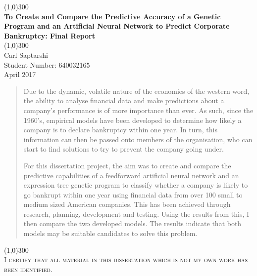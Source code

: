 \documentclass[11pt]{article}
\begin{document}
	\begin{titlepage}
		\begin{center}
			\line(1,0){300}\\
			[0.25in]
			\huge{\bfseries To Create and Compare the Predictive Accuracy of a Genetic Program and an Artificial Neural Network to Predict Corporate Bankruptcy: Final Report}\\
			\line(1,0){300}\\
			[0.25in]
			 Carl Saptarshi\\
			 \large  Student Number: 640032165 \\
			 April 2017 \\
			 \null\vspace{\fill}
			 \begin{center}
			 \begin{abstract}\large
			 Due to the dynamic, volatile nature of the economies of the western word, the ability to analyse financial data and make predictions about a 			company's performance is of more importance than ever. As such, since the 1960's, empirical models have been developed to determine 			how likely a company is to declare bankruptcy within one year. In turn, this information can then be passed onto members of the 					organisation, who can start to find solutions to try to prevent the company going under. 

			For this dissertation project, the aim was to create and compare the predictive capabilities of a feedforward artificial neural network and an 			expression tree genetic program to classify whether a company is likely to go bankrupt within one year using financial data from over 100 			small to medium sized American companies. This has been achieved through research, planning, development and testing. Using the results 			from this, I then compare the two developed models. The results indicate that both models may be suitable candidates to solve this problem.
			 \end{abstract}
			 \end{center}
		
			 
		\end{center}
\begin{center}
\line(1,0){300}\\
[4cm]
\textsc{\large  I certify that all material in this dissertation which is not my own work has been identified.} \\
\end{center}
\end{titlepage}
\end{document}
